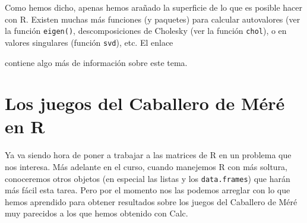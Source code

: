 \documentclass[10pt,a4paper]{article}\usepackage[]{graphicx}\usepackage[]{color}
\newcounter {cont01}
\begin{document}
Como hemos dicho, apenas hemos arañado la superficie de lo que es posible hacer con R. Existen muchas más funciones (y paquetes) para calcular autovalores (ver la función {\tt eigen()}, descomposiciones de Cholesky (ver la función {\tt chol}), o en valores singulares  (función {\tt svd}), etc. El enlace
                                                                                                                                                            \begin{center}
                                                                                                                                                            \end{center}
                                                                                                                                                            contiene algo más de información sobre este tema.
                                                                                                                                                            
                                                                                                                                                            \section{Los juegos del Caballero de Méré en R}
                                                                                                                                                            \label{tut03:sec:JuegosCaballeroMereR}
                                                                                                                                                            
                                                                                                                                                            Ya va siendo hora de poner a trabajar a las matrices de R en un problema que nos interesa. Más adelante en el curso, cuando  manejemos R con más soltura, conoceremos otros objetos (en especial las listas y los {\tt data.frames}) que harán más fácil esta tarea. Pero por el momento nos las podemos arreglar con lo que hemos aprendido para obtener resultados sobre los juegos del Caballero de Méré muy parecidos a los que hemos obtenido con Calc.
                                                                                                                                                            
\end{document}
